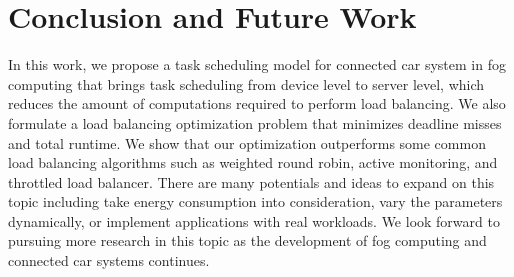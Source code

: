 \section{Conclusion and Future Work}
\label{s5}



In this work, we propose a task scheduling model for connected car system in fog computing that brings task scheduling from device level to server level, which reduces the amount of computations required to perform load balancing. We also formulate a load balancing optimization problem that minimizes deadline misses and total runtime. We show that our optimization outperforms some common load balancing algorithms such as weighted round robin, active monitoring, and throttled load balancer. There are many potentials and ideas to expand on this topic including take energy consumption into consideration, vary the parameters dynamically, or implement applications with real workloads. We look forward to pursuing more research in this topic as the development of fog computing and connected car systems continues.
